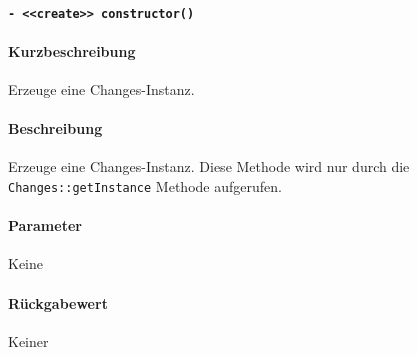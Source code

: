 \paragraph{\texttt{- <<create>> constructor()}}%
\paragraph*{Kurzbeschreibung}
Erzeuge eine Changes-Instanz.
\paragraph*{Beschreibung}
Erzeuge eine Changes-Instanz.
Diese Methode wird nur durch die \verb#Changes::getInstance# Methode aufgerufen.
\paragraph*{Parameter}
Keine
\paragraph*{Rückgabewert}
Keiner